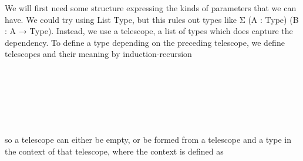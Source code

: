 We will first need some structure expressing the kinds of parameters that we can have. We could try using List Type, but this rules out types like Σ (A : Type) (B : A → Type). Instead, we use a telescope, a list of types which does capture the dependency. To define a type depending on the preceding telescope, we define telescopes and their meaning by induction-recursion 
\begin{code}[hide]%
\>[0]\AgdaSpace{}%
\AgdaSpace{}%
\<%
\end{code}
\begin{code}%
\>[0][@{}l@{\AgdaIndent{1}}]%
\>[2]\AgdaSpace{}%
\AgdaSpace{}%
\AgdaSymbol{:}\AgdaSpace{}%
\<%
\\
%
\>[2]\AgdaSpace{}%
\AgdaSymbol{:}\AgdaSpace{}%
\AgdaSpace{}%
\AgdaSpace{}%
\<%
\\
\>[0]\<%
\\
%
\>[2]\AgdaSpace{}%
\AgdaSpace{}%
\<%
\\
\>[2][@{}l@{\AgdaIndent{0}}]%
\>[4]%
\>[9]\AgdaSymbol{:}\AgdaSpace{}%
\<%
\\
%
\>[4]%
\>[9]\AgdaSymbol{:}\AgdaSpace{}%
\AgdaSymbol{(}\AgdaSpace{}%
\AgdaSymbol{:}\AgdaSpace{}%
\AgdaSymbol{)}\AgdaSpace{}%
\AgdaSymbol{(}\AgdaSpace{}%
\AgdaSymbol{:}\AgdaSpace{}%
\AgdaSpace{}%
\AgdaSpace{}%
\AgdaSpace{}%
\AgdaSpace{}%
\AgdaSymbol{)}\AgdaSpace{}%
\AgdaSpace{}%
\<%
\end{code}
so a telescope can either be empty, or be formed from a telescope and a type in the context of that telescope, where the context is defined as
\begin{code}[hide]%
%
\>[2]\AgdaSpace{}%
%
\>[11]\AgdaSpace{}%
\AgdaSymbol{=}\AgdaSpace{}%
\<%
\\
%
\>[2]\AgdaSpace{}%
\AgdaSpace{}%
\AgdaSpace{}%
%
\>[11]\AgdaSpace{}%
\AgdaSymbol{=}\AgdaSpace{}%
\AgdaSpace{}%
\AgdaSpace{}%
\AgdaSpace{}%
\AgdaSpace{}%
\<%
\end{code}
